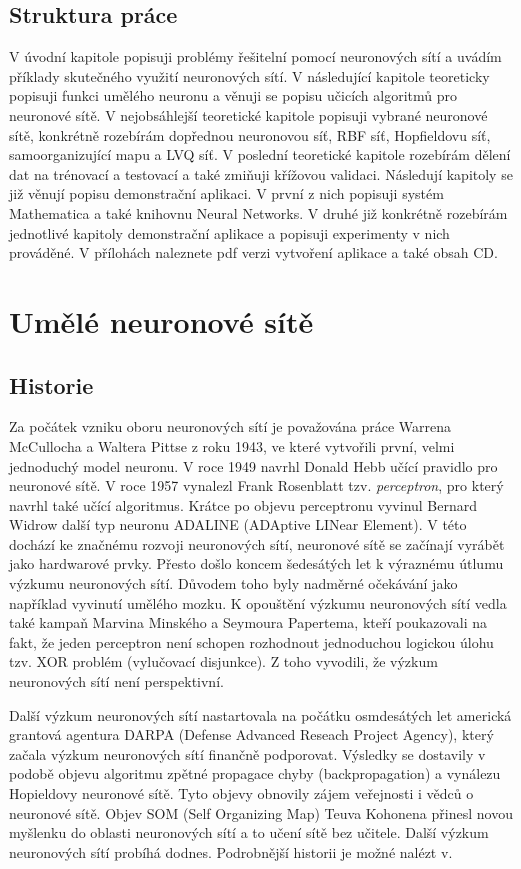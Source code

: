 \documentclass[11pt,twoside,a4paper]{book}
\begin{document}
\section{Struktura práce}
V úvodní kapitole popisuji problémy řešitelní pomocí neuronových sítí a uvádím příklady skutečného využití neuronových sítí. V následující kapitole teoreticky popisuji funkci umělého neuronu a věnuji se popisu učicích algoritmů pro neuronové sítě. V nejobsáhlejší teoretické kapitole popisuji vybrané neuronové sítě, konkrétně rozebírám dopřednou neuronovou síť, RBF síť, Hopfieldovu síť, samoorganizující mapu a LVQ síť. V poslední teoretické kapitole rozebírám dělení dat na trénovací a testovací a také zmiňuji křížovou validaci. Následují kapitoly se již věnují popisu demonstrační aplikaci. V první z nich popisuji systém Mathematica a také knihovnu Neural Networks. V druhé již konkrétně rozebírám jednotlivé kapitoly demonstrační aplikace a popisuji experimenty v nich prováděné. V přílohách naleznete pdf verzi vytvoření aplikace a také obsah CD.

\chapter{Umělé neuronové sítě}
\section{Historie}
Za počátek vzniku oboru neuronových sítí je považována práce Warrena McCullocha a Waltera Pittse z roku 1943, ve které vytvořili první, velmi jednoduchý model neuronu. V roce 1949 navrhl Donald Hebb učící pravidlo pro neuronové sítě. V roce 1957 vynalezl Frank Rosenblatt tzv. \textit{perceptron}, pro který navrhl také učící algoritmus. Krátce po objevu perceptronu vyvinul Bernard Widrow další typ neuronu ADALINE (ADAptive LINear Element). V této dochází ke značnému rozvoji neuronových sítí, neuronové sítě se začínají vyrábět jako hardwarové prvky. Přesto došlo koncem šedesátých let k výraznému útlumu výzkumu neuronových sítí. Důvodem toho byly nadměrné očekávání jako například vyvinutí umělého mozku. K opouštění výzkumu neuronových sítí vedla také kampaň Marvina Minského a Seymoura Papertema, kteří poukazovali na fakt, že jeden perceptron není schopen rozhodnout jednoduchou logickou úlohu tzv. XOR problém (vylučovací disjunkce). Z toho vyvodili, že výzkum neuronových sítí není perspektivní.

Další výzkum neuronových sítí nastartovala na počátku osmdesátých let americká grantová agentura DARPA (Defense Advanced Reseach Project Agency), který začala výzkum neuronových sítí finančně podporovat. Výsledky se dostavily v podobě objevu algoritmu zpětné propagace chyby (backpropagation) a vynálezu Hopieldovy neuronové sítě. Tyto objevy obnovily zájem veřejnosti i vědců o neuronové sítě. Objev SOM (Self Organizing Map) Teuva Kohonena přinesl novou myšlenku do oblasti neuronových sítí a to učení sítě bez učitele. Další výzkum neuronových sítí probíhá dodnes. Podrobnější historii je možné nalézt v\cite{teoret}.
\end{document}
